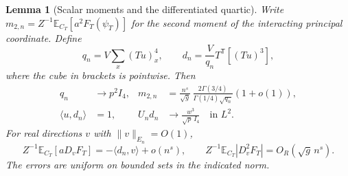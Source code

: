 \documentclass[11pt]{article}
\numberwithin{equation}{section}
\newtheorem{lemma}[theorem]{Lemma}
\newcommand{\E}{\mathbb E}
\newcommand{\ip}[2]{\langle #1,#2\rangle}
\begin{document}
\begin{lemma}[Scalar moments and the differentiated quartic]\label{lem:quartic}
Write $m_{2,n}=Z^{-1}\E_{C_T}[a^2F_T(\psi_T)]$ for the second moment of the interacting principal coordinate. Define
\begin{equation}
 q_n=V\sum_x(Tu)_x^4,\qquad
 d_n=\frac{V}{q_n}T^{\mathsf T}[(Tu)^3],
\end{equation}
where the cube in brackets is pointwise. Then
\begin{align}
 q_n&\longrightarrow p^2 I_4,&
 m_{2,n}&=\frac{n^s}{\sqrt g}\,
       \frac{2\Gamma(3/4)}{\Gamma(1/4)\sqrt{q_n}}(1+o(1)),
 \label{eq:gamma}\\
 \ip{u}{d_n}&=1,& U_n d_n&\longrightarrow
              \frac{w^3}{\sqrt p\,I_4}\quad\text{in }L^2 .
 \label{eq:cubic}
\end{align}
For real directions $v$ with $\|v\|_{E_n}=O(1)$,
\begin{equation}
 Z^{-1}\E_{C_T}[aD_v F_T]=-\ip{d_n}{v}+o(n^s),\qquad
 Z^{-1}\E_{C_T}|D_v^2 F_T|=O_R(\sqrt g\,n^s).
 \label{eq:direction}
\end{equation}
The errors are uniform on bounded sets in the indicated norm.
\end{lemma}
\end{document}
